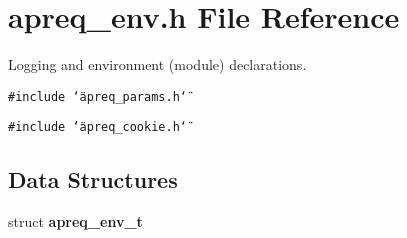 \section{apreq\_\-env.h File Reference}
\label{apreq__env_8h}
Logging and environment (module) declarations. 


{\tt \#include \char`\"{}apreq\_\-params.h\char`\"{}}\par
{\tt \#include \char`\"{}apreq\_\-cookie.h\char`\"{}}\par
\subsection*{Data Structures}
\begin{CompactItemize}
\item 
struct {\bf apreq\_\-env\_\-t}
\end{CompactItemize}
